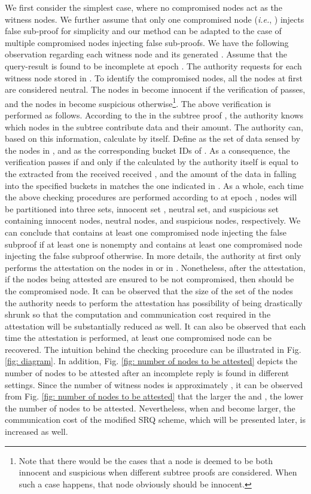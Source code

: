 \documentclass[conference]{IEEEtran}
\begin{document}
We first consider the simplest case, where no compromised nodes act as the witness nodes. We further assume that only one compromised node (\emph{i.e.}, ) injects false sub-proof for simplicity and our method can be adapted to the case of multiple compromised nodes injecting false sub-proofs. We have the following observation regarding each witness node  and its generated . Assume that the query-result is found to be incomplete at epoch . The authority requests  for each witness node  stored in . To identify the compromised nodes, all the nodes at first are considered neutral. The nodes in  become innocent if the verification of  passes, and the nodes in  become suspicious otherwise\footnote{Note that there would be the cases that a node is deemed to be both innocent and suspicious when different subtree proofs are considered. When such a case happens, that node obviously should be innocent.}. The above verification is performed as follows. According to the  in the subtree proof , the authority knows which nodes in the subtree  contribute data and their amount. The authority can, based on this information, calculate  by itself. Define  as the set of data sensed by the nodes in , and  as the corresponding bucket IDs of . As a consequence, the verification passes if and only if the  calculated by the authority itself is equal to the  extracted from the received received , and the amount of the data in  falling into the specified buckets in  matches the one indicated in . As a whole, each time the above checking procedures are performed according to  at epoch , nodes will be partitioned into three sets, innocent set , neutral set, and suspicious set  containing innocent nodes, neutral nodes, and suspicious nodes, respectively. We can conclude that  contains at least one compromised node injecting the false subproof if at least one  is nonempty and  contains at least one compromised node injecting the false subproof otherwise. In more details, the authority at first only performs the attestation \cite{slpdk06,smkk05,spdk04} on the nodes in  or in . Nonetheless, after the attestation, if the nodes being attested are ensured to be not compromised, then  should be the compromised node. It can be observed that the size of the set of the nodes the authority needs to perform the attestation has possibility of being drastically shrunk so that the computation and communication cost required in the attestation will be substantially reduced as well. It can also be observed that each time the attestation is performed, at least one compromised node can be recovered. The intuition behind the checking procedure can be illustrated in Fig. \ref{fig: diagram}. In addition, Fig. \ref{fig: number of nodes to be attested} depicts the number of nodes to be attested after an incomplete reply is found in different settings. Since the number of witness nodes is approximately , it can be observed from Fig. \ref{fig: number of nodes to be attested} that the larger the  and , the lower the number of nodes to be attested. Nevertheless, when  and  become larger, the communication cost of the modified SRQ scheme, which will be presented later, is increased as well.
\end{document}
